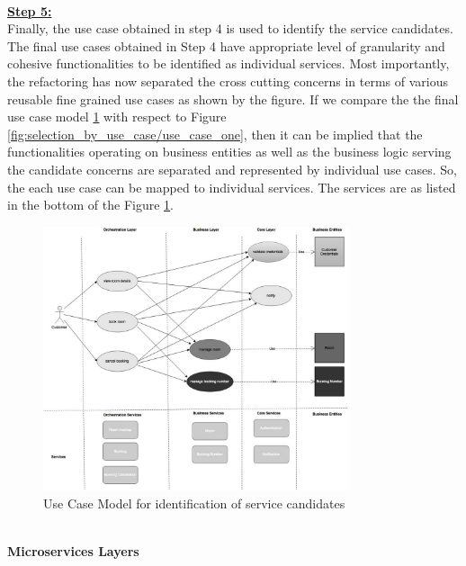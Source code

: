 \\
\textbf{\underline{Step 5:}}
\\
Finally, the use case obtained in step 4 is used to identify the service candidates. The final use cases obtained in Step 4 have appropriate level of granularity and cohesive functionalities to be identified as individual services. Most importantly, the refactoring has now separated the cross cutting concerns in terms of various reusable fine grained use cases as shown by the figure. If we compare the the final use case model \ref{fig:selection_by_use_case/use_case_five} with respect to Figure \ref{fig:selection_by_use_case/use_case_one}, then it can be implied that the functionalities operating on business entities as well as the business logic serving the candidate concerns are separated and represented by individual use cases. So, the each use case can be mapped to individual services. The services are as listed in the bottom of the Figure \ref{fig:selection_by_use_case/use_case_five}.
\\
\begin{figure}[H]
\begin{center}
\includegraphics[width=0.8\textwidth]{figures/use-case-five}
\caption{Use Case Model for identification of service candidates}
\label{fig:selection_by_use_case/use_case_five}
\end{center}
\end{figure}
\\
\textbf{Microservices Layers}\\
